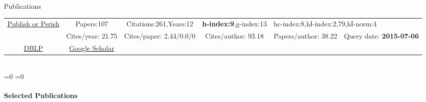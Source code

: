 \begin{rubrique}{Publications}

    {\footnotesize

      \begin{tabular}{|c||ccccc|}
        \hline
        \multirow{2}{4em}{\href{http://www.harzing.com/pop.htm}{Publish or Perish}} &
        Papers:107    & Citations:261,Years:12     & \textbf{h-index:9},g-index:13 &
        \multicolumn{2}{l|}{hc-index:8,hI-index:2,79,hI-norm:4}
        \\
        &Cites/year: 21.75 & Cites/paper: 2.44/0.0/0 & Cites/author: 93.18 &
        Papers/author: 38.22 & Query date: \textbf{2015-07-06}
        \\
        \hline
        \href{http://www.informatik.uni-trier.de/~ley/pers/hd/v/Varrette:S=eacute=bastien.html}{DBLP} & 
        \multicolumn{1}{c|}{\href{https://scholar.google.fr/citations?hl=fr\&user=6PTStIcAAAAJ\&view_op=list_works\&sortby=pubdate}{Google Scholar}}\\
        \cline{1-2} 
      \end{tabular}
    }
    ~\\[2em]

    \ifnum\pdfstrcmp{\cvtype}{\cvtiny}=0%
    \else
    \ifnum\pdfstrcmp{\cvtype}{\cvfull}=0%



    \else
    \vspace{-1em}
    \paragraph{Selected Publications}~\\

    \fi
    \fi
    
\end{rubrique}





% 
